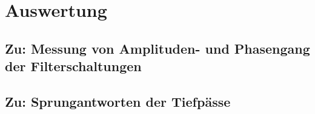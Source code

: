 \section{Auswertung}
\subsection{Zu: Messung von Amplituden- und Phasengang der Filterschaltungen}


\newpage

\subsection{Zu: Sprungantworten der Tiefpässe}



\newpage